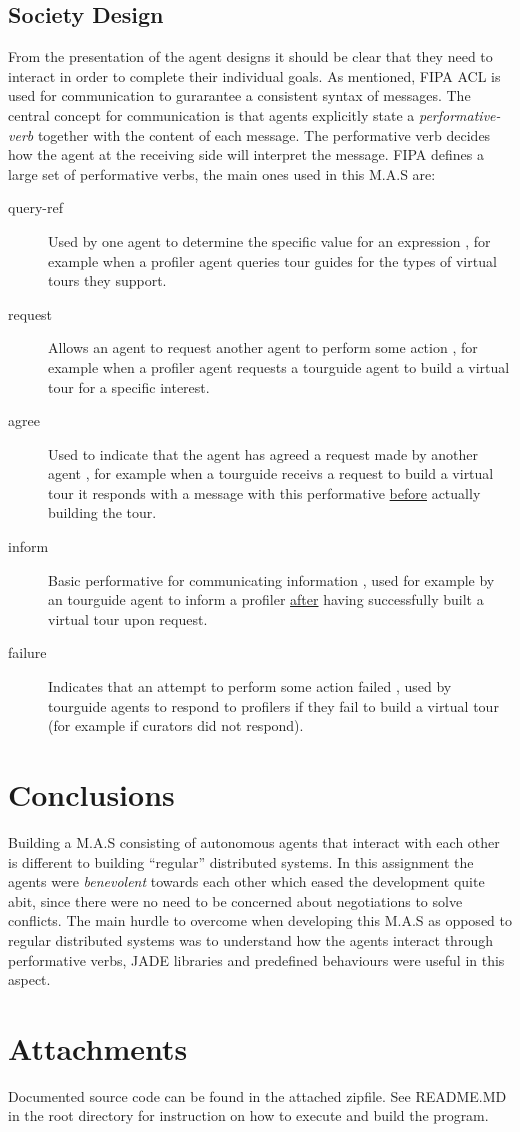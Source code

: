 \documentclass[a4paper, 11pt]{article}
\begin{document}
\subsection*{Society Design}
From the presentation of the agent designs it should be clear that they need to interact in order to complete their individual goals. As mentioned, FIPA ACL is used for communication to gurarantee a consistent syntax of messages. The central concept for communication is that agents explicitly state a \textit{performative-verb} together with the content of each message. The performative verb decides how the agent at the receiving side will interpret the message. FIPA defines a large set of performative verbs, the main ones used in this M.A.S are:
\begin{description}
\item[query-ref] Used by one agent to determine the specific value for an expression \citep{coursebook}, for example when a profiler agent queries tour guides for the types of virtual tours they support.
\item[request] Allows an agent to request another agent to perform some action \citep{coursebook}, for example when a profiler agent requests a tourguide agent to build a virtual tour for a specific interest.
\item[agree] Used to indicate that the agent has agreed a request made by another agent \citep{coursebook}, for example when a tourguide receivs a request to build a virtual tour it responds with a message with this performative \underline{before} actually building the tour.
\item[inform] Basic performative for communicating information \citep{coursebook}, used for example by an tourguide agent to inform a profiler \underline{after} having successfully built a virtual tour upon request.
\item[failure] Indicates that an attempt to perform some action failed \citep{coursebook}, used by tourguide agents to respond to profilers if they fail to build a virtual tour (for example if curators did not respond).
\end{description}
\section*{Conclusions}
Building a M.A.S consisting of autonomous agents that interact with each other is different to building ``regular'' distributed systems. In this assignment the agents were \textit{benevolent} towards each other which eased the development quite abit, since there were no need to be concerned about negotiations to solve conflicts. The main hurdle to overcome when developing this M.A.S as opposed to regular distributed systems was to understand how the agents interact through performative verbs, JADE libraries and predefined behaviours were useful in this aspect.

\section*{Attachments}
Documented source code can be found in the attached zipfile. See README.MD in the root directory for instruction on how to execute and build the program.

{}

\end{document}

